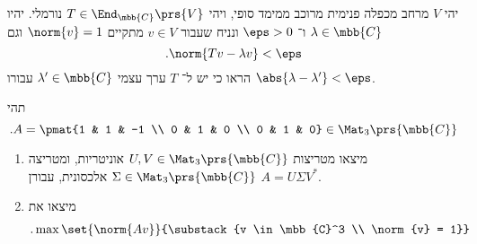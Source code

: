 \documentclass[a4paper,10pt,twoside,openany]{article}
\begin{document}
\begin{exercise}
יהי
$V$
מרחב מכפלה פנימית מרוכב ממימד סופי, ויהי
$T \in \End_{\mbb{C}}\prs{V}$
נורמלי.
יהיו $\lambda \in \mbb{C}$
ו־%
$\eps > 0$
ונניח שעבור
$v \in V$
מתקיים
$\norm{v} = 1$
וגם
\[\text{.} \norm{Tv - \lambda v} < \eps\]
הראו כי יש ל־%
$T$
ערך עצמי
$\lambda' \in \mbb{C}$
עבורו
$\abs{\lambda - \lambda'} < \eps$.
\end{exercise}

\begin{exercise}
תהי
\[\text{.} A = \pmat{1 & 1 & -1 \\ 0 &  1 & 0 \\ 0 & 1 & 0} \in \Mat_3\prs{\mbb{C}}\]
\begin{enumerate}

\item מיצאו מטריצות
$U,V \in \Mat_3\prs{\mbb{C}}$
אוניטריות, ומטריצה
$\Sigma \in \Mat_3\prs{\mbb{C}}$
אלכסונית, עבורן
$A = U \Sigma V^*$.

\item
מיצאו את
\begin{align*}
\text{.} \max\set{\norm{Av}}{\substack{v \in \mbb{C}^3 \\ \norm{v} = 1}}
\end{align*}
\end{enumerate}
\end{exercise}
\end{document}
